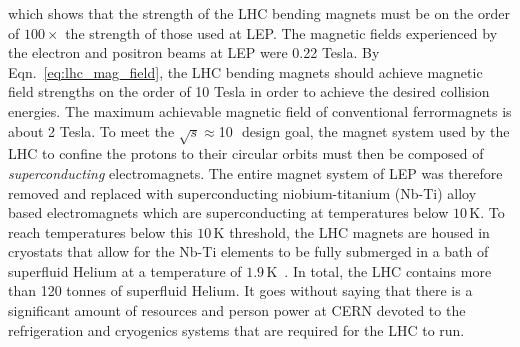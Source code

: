 which shows that the strength of the LHC bending magnets must be on the order of $100\times$
the strength of those used at LEP. The magnetic fields experienced by the electron and positron beams
at LEP were 0.22 Tesla. By Eqn.~\ref{eq:lhc_mag_field}, the LHC bending magnets should achieve magnetic field
strengths on the order of 10 Tesla in order to achieve the desired collision energies.
The maximum achievable magnetic field of conventional ferrormagnets is about 2 Tesla.
To meet the $\sqrt{s}\approx$10\,\TeV~design goal, the magnet system used by the LHC to confine the protons to their circular orbits
must then be composed of \textit{superconducting} electromagnets. %
The entire magnet system of LEP was therefore removed and replaced with superconducting
niobium-titanium (Nb-Ti) alloy based electromagnets which are superconducting
at temperatures below $10$\,K.
To reach temperatures below this $10$\,K threshold, the LHC magnets
are housed in cryostats that allow for the Nb-Ti elements to be fully submerged in a bath
of superfluid Helium at a temperature of $1.9$\,K~\cite{Casas:1992nf}.
In total, the LHC contains more than 120 tonnes of superfluid Helium.
It goes without saying that there is a significant amount of resources and person power at CERN devoted to the refrigeration and cryogenics
systems that are required for the LHC to run.

